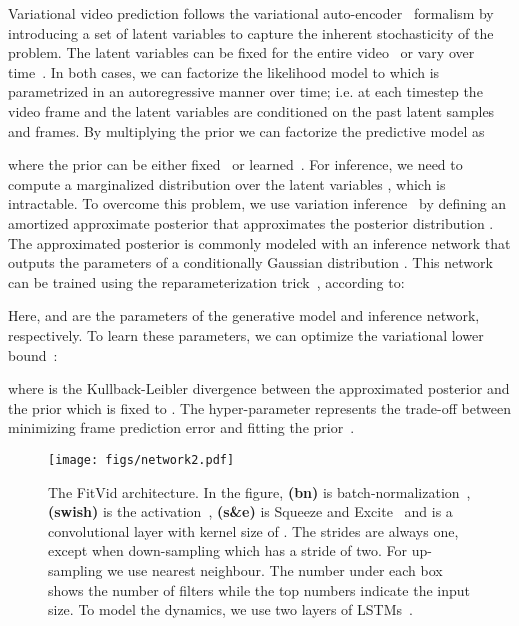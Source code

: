\documentclass{article}
\newcommand{\model}{FitVid\xspace}
\begin{document}
Variational video prediction follows the variational auto-encoder~\cite{kingma2013auto} formalism by introducing a set of latent variables  to capture the inherent stochasticity of the problem. The latent variables can be fixed for the entire video~\cite{babaeizadeh2017stochastic} or vary over time~\cite{denton2018stochastic}. In both cases, we can factorize the likelihood model to  which is parametrized in an autoregressive manner over time; i.e. at each timestep  the video frame  and the latent variables  are conditioned on the past latent samples and frames. By multiplying the prior we can factorize the predictive model as 
 
where the prior  can be either fixed~\cite{kingma2013auto, babaeizadeh2017stochastic} or learned~\cite{chung2015recurrent, denton2018stochastic, castrejon2019improved}. For inference, we need to compute a marginalized distribution over the latent variables , which is intractable. To overcome this problem, we use variation inference~\cite{jordan1999introduction} by defining an amortized approximate posterior  that approximates the posterior distribution . The approximated posterior is commonly modeled with an inference network  that outputs the parameters of a conditionally Gaussian distribution . This network can be trained using the reparameterization trick~\citep{kingma2013auto}, according to:

Here,  and  are the parameters of the generative model and inference network, respectively. To learn these parameters, we can optimize the variational lower bound~\cite{kingma2013auto,rezende2014stochastic}:


where  is the Kullback-Leibler divergence between the approximated posterior and the prior  which is fixed to . The hyper-parameter  represents the trade-off between minimizing frame prediction error and fitting the prior~\cite{higgins2016beta, higgins2016early,  denton2018stochastic}.


\begin{figure}[t]
  \centering
  \texttt{[image: figs/network2.pdf]}
  \caption{The \model architecture. In the figure, \textbf{(bn)} is batch-normalization~\cite{ioffe2015batch}, \textbf{(swish)} is the activation~\cite{ramachandran2017searching}, \textbf{(s\&e)} is Squeeze and Excite~\cite{hu2018squeeze} and  is a convolutional layer with kernel size of . The strides are always one, except when down-sampling which has a stride of two. For up-sampling we use nearest neighbour. The number under each box shows the number of filters while the top numbers indicate the input size. To model the dynamics, we use two layers of LSTMs~\cite{hochreiter1997long}.}
  \label{fig:model}
\end{figure}
\end{document}
